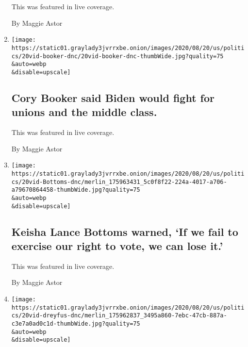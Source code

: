 \begin{enumerate}
  This was featured in live coverage.

  By Maggie Astor
\item
  \href{/live/2020/08/20/us/dnc-convention-election/cory-booker-said-biden-would-fight-for-unions-and-the-middle-class}{}

  \texttt{[image: https://static01.graylady3jvrrxbe.onion/images/2020/08/20/us/politics/20vid-booker-dnc/20vid-booker-dnc-thumbWide.jpg?quality=75\\\&auto=webp\\\&disable=upscale]}

  \hypertarget{cory-booker-said-biden-would-fight-for-unions-and-the-middle-class}{%
  \subsection{Cory Booker said Biden would fight for unions and the
  middle
  class.}\label{cory-booker-said-biden-would-fight-for-unions-and-the-middle-class}}

  This was featured in live coverage.

  By Maggie Astor
\item
  \href{/live/2020/08/20/us/dnc-convention-election/keisha-lance-bottoms-warned-if-we-fail-to-exercise-our-right-to-vote-we-can-lose-it}{}

  \texttt{[image: https://static01.graylady3jvrrxbe.onion/images/2020/08/20/us/politics/20vid-Bottoms-dnc/merlin\_175963431\_5c0f8f22-224a-4017-a706-a79670864458-thumbWide.jpg?quality=75\\\&auto=webp\\\&disable=upscale]}

  \hypertarget{keisha-lance-bottoms-warned-if-we-fail-to-exercise-our-right-to-vote-we-can-lose-it}{%
  \subsection{Keisha Lance Bottoms warned, `If we fail to exercise our
  right to vote, we can lose
  it.'}\label{keisha-lance-bottoms-warned-if-we-fail-to-exercise-our-right-to-vote-we-can-lose-it}}

  This was featured in live coverage.

  By Maggie Astor
\item
  \href{/live/2020/08/20/us/dnc-convention-election/julia-louis-dreyfus-said-biden-was-a-fan-of-her-amtrak-magazine-cover}{}

  \texttt{[image: https://static01.graylady3jvrrxbe.onion/images/2020/08/20/us/politics/20vid-dreyfus-dnc/merlin\_175962837\_3495a860-7ebc-47cb-887a-c3e7a0ad0c1d-thumbWide.jpg?quality=75\\\&auto=webp\\\&disable=upscale]}


\end{enumerate}
